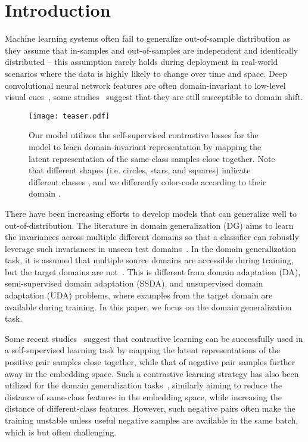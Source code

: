 \documentclass[10pt,twocolumn,letterpaper]{article}
\begin{document}
\section{Introduction}
Machine learning systems often fail to generalize out-of-sample distribution as they assume that in-samples and out-of-samples are independent and identically distributed -- this assumption rarely holds during deployment in real-world scenarios where the data is highly likely to change over time and space. Deep convolutional neural network features are often domain-invariant to low-level visual cues~\cite{peng2015learning}, 
some studies~\cite{donahuedeep} suggest that they are still susceptible to domain shift.

\begin{figure}[t]
\begin{center}
   \texttt{[image: teaser.pdf]}
\end{center}
   \caption{Our model utilizes the self-supervised contrastive losses for the model to learn domain-invariant representation by mapping the latent representation of the same-class samples close together. Note that different shapes (i.e. circles, stars, and squares) indicate different classes , and we differently color-code according to their domain .}
\label{fig:teaser} \end{figure}


There have been increasing efforts to develop models that can generalize well to out-of-distribution. The literature in domain generalization (DG) aims to learn the invariances across multiple different domains so that a classifier can robustly leverage such invariances in unseen test domains~\cite{vapnik1998statistical, ganin2016domain, li2018deep, li2018domain, muandet2013domain, sun2016deep}. In the domain generalization task, it is assumed that multiple source domains are accessible during training, but the target domains are not~\cite{blanchard2011generalizing, muandet2013domain}. This is different from domain adaptation (DA), semi-supervised domain adaptation (SSDA), and unsupervised domain adaptation (UDA) problems, where examples from the target domain are available during training. In this paper, we focus on the domain generalization task.

Some recent studies~\cite{chen2020simple,he2020momentum,oord2018representation} suggest that contrastive learning can be successfully used in a self-supervised learning task by mapping the latent representations of the positive pair samples close together, while that of negative pair samples further away in the embedding space. Such a contrastive learning strategy has also been utilized for the domain generalization tasks~\cite{motiian2017unified, dou2019domain}, similarly aiming to reduce the distance of same-class features in the embedding space, while increasing the distance of different-class features. However, such negative pairs often make the training unstable unless useful negative samples are available in the same batch, which is but often challenging. 
\end{document}
